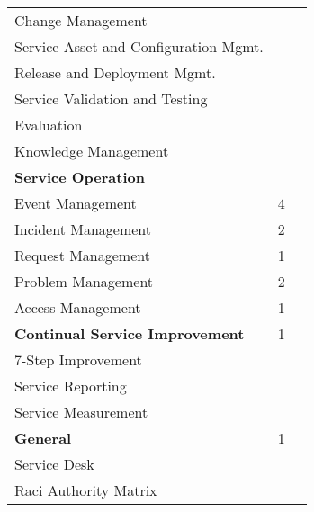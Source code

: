 \begin{table}[h!]
\begin{tabular}{|p{6.1cm}|p{4.5cm}|p{4.5cm}|}
Change Management                   &                                &\\
Service Asset and Configuration Mgmt.                   &                                &\\
Release and Deployment Mgmt.                   &                                &\\
Service Validation and Testing                   &                                &\\
Evaluation                   &                                &\\
Knowledge Management                   &                                &\\\hline
\textbf{Service Operation}          &                                &\\
Event Management                   &         4                       &\\
Incident Management                   &        2                        &\\
Request Management                   &          1                      &\\
Problem Management                   &         2                       &\\
Access Management                   &           1                     &\\\hline
\textbf{Continual Service Improvement}          &   1                             &\\
7-Step Improvement                   &                                &\\
Service Reporting                   &                                &\\
Service Measurement                 &                                &\\\hline
\textbf{General}                   &           1                      &\\
Service Desk                       &                                 &\\
Raci Authority Matrix                    &                           &\\\hline
\end{tabular}
\label{tab:SupportedITSMProcesses}
\end{table}
